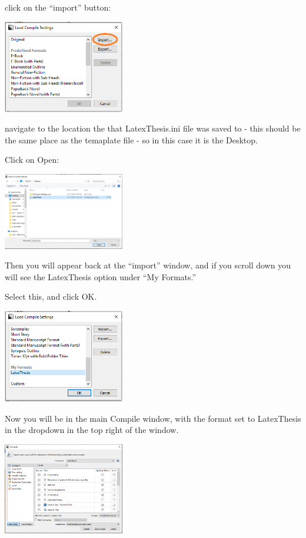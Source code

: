 \documentclass{article}
\begin{document}
click on the ``import'' button:

\includegraphics[width=200px]{images/scriv013.PNG}


navigate to the location the that LatexThesis.ini file was saved to - this should be the same place as the temaplate file - so in this case it is the Desktop.

Click on Open:

\includegraphics[width=200px]{images/scriv014.PNG}

Then you will appear back at the ``import'' window, and if you scroll down you will see the LatexThesis option under ``My Formats.''

Select this, and click OK.

\includegraphics[width=200px]{images/scriv015.PNG}

Now you will be in the main Compile window, with the format set to LatexThesis in the dropdown in the top right of the window. 

\includegraphics[width=200px]{images/scriv016.PNG}
\end{document}
